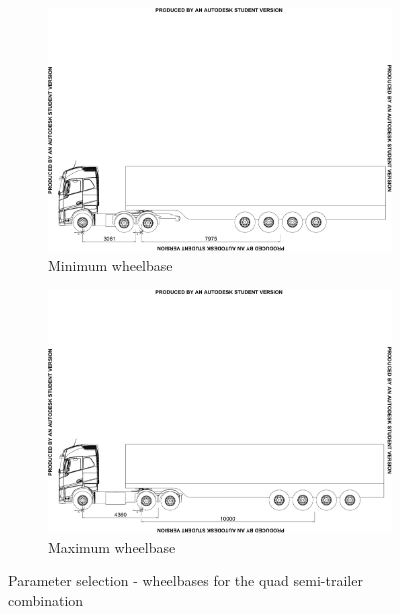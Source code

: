 \begin{figure}[!htbp]
	\centering
	\begin{subfigure}[t]{1\textwidth}
		\centering
		\includegraphics[width=1\textwidth]{fig/parameter-selection_wheelbase_min_quad-semi-trailer}
		\caption{Minimum wheelbase}
	\end{subfigure}%

	\begin{subfigure}[t]{1\textwidth}
		\centering
		\includegraphics[width=1\textwidth]{fig/parameter-selection_wheelbase_max_quad-semi-trailer}
		\caption{Maximum wheelbase}
	\end{subfigure}

	\caption{Parameter selection - wheelbases for the quad semi-trailer combination}
	\label{figure:parameter-selection-wheelbase-quad-semi-trailer}
\end{figure}

